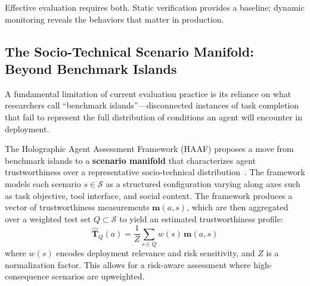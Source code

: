 \documentclass[11pt]{article}
\newcommand{\keyword}[1]{\textbf{#1}}
\begin{document}
\begin{table}[htbp]
\centering
\caption{Static verification vs.\ dynamic execution monitoring.}
\label{tab:static_vs_dynamic}
\end{table}

Effective evaluation requires both. Static verification provides a baseline; dynamic monitoring reveals the behaviors that matter in production.

\subsection{The Socio-Technical Scenario Manifold: Beyond Benchmark Islands}

A fundamental limitation of current evaluation practice is its reliance on what researchers call ``benchmark islands''---disconnected instances of task completion that fail to represent the full distribution of conditions an agent will encounter in deployment.

The Holographic Agent Assessment Framework (HAAF) proposes a move from benchmark islands to a \keyword{scenario manifold} that characterizes agent trustworthiness over a representative socio-technical distribution~\citep{beyond_benchmark_islands}. The framework models each scenario $s \in \mathcal{S}$ as a structured configuration varying along axes such as task objective, tool interface, and social context. The framework produces a vector of trustworthiness measurements $\mathbf{m}(a, s)$, which are then aggregated over a weighted test set $Q \subset \mathcal{S}$ to yield an estimated trustworthiness profile:
\begin{equation}
    \hat{\mathbf{T}}_Q(a) = \frac{1}{Z} \sum_{s \in Q} w(s)\, \mathbf{m}(a, s)
\end{equation}
where $w(s)$ encodes deployment relevance and risk sensitivity, and $Z$ is a normalization factor. This allows for a risk-aware assessment where high-consequence scenarios are upweighted.
\end{document}
